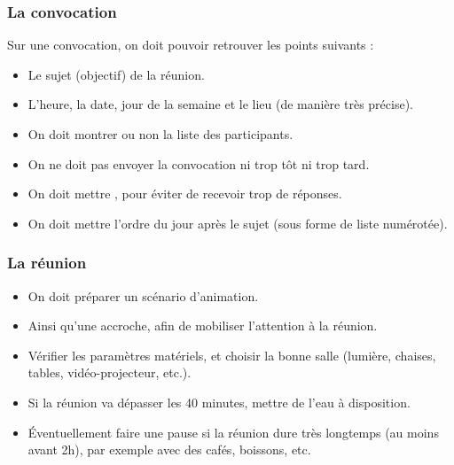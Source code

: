\subsubsection{La convocation}
Sur une convocation, on doit pouvoir retrouver les points suivants :
\begin{itemize}
    \item Le sujet (objectif) de la réunion.
    \item L'heure, la date, jour de la semaine et le lieu (de manière très précise).
    \item On doit montrer ou non la liste des participants.
    \item On ne doit pas envoyer la convocation ni trop tôt ni trop tard.
    \item On doit mettre , pour éviter de recevoir trop de réponses.
    \item On doit mettre l'ordre du jour après le sujet (sous forme de liste numérotée).
\end{itemize}

\subsubsection{La réunion}
\begin{itemize}
    \item On doit préparer un scénario d'animation.
    \item Ainsi qu'une accroche, afin de mobiliser l'attention à la réunion.
    \item Vérifier les paramètres matériels, et choisir la bonne salle (lumière, chaises, tables, vidéo-projecteur, etc.).
    \item Si la réunion va dépasser les 40 minutes, mettre de l'eau à disposition.
    \item Éventuellement faire une pause si la réunion dure très longtemps (au moins avant 2h), par exemple avec des cafés, boissons, etc.
\end{itemize}
